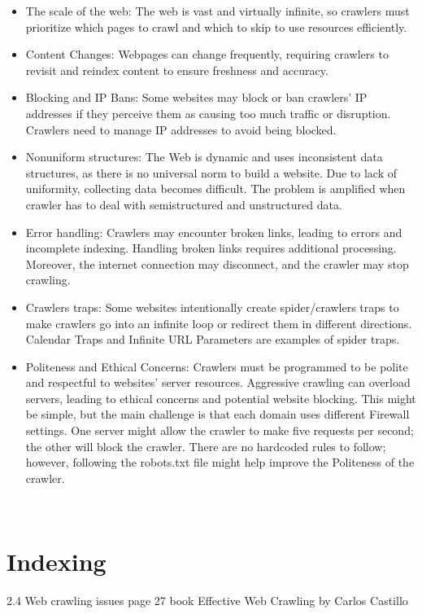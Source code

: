 \begin{itemize}
\item The scale of the web: The web is vast and virtually infinite, so crawlers must prioritize which pages to crawl and which to skip to use resources efficiently.

\item Content Changes: Webpages can change frequently, requiring crawlers to revisit and reindex content to ensure freshness and accuracy.

\item Blocking and IP Bans: Some websites may block or ban crawlers' IP addresses if they perceive them as causing too much traffic or disruption. Crawlers need to manage IP addresses to avoid being blocked.

\item Nonuniform structures: The Web is dynamic
and uses inconsistent data structures, as there is
no universal norm to build a website. Due to lack of uniformity, collecting data becomes difficult. The problem is amplified when crawler has to deal with semistructured and unstructured data.

\item Error handling: Crawlers may encounter broken links, leading to errors and incomplete indexing. Handling broken links requires additional processing. Moreover, the internet connection may disconnect, and the crawler may stop crawling. 

\item Crawlers traps: Some websites intentionally create spider/crawlers traps to make crawlers go into an infinite loop or redirect them in different directions. Calendar Traps and Infinite URL Parameters are examples of spider traps.

\item Politeness and Ethical Concerns: Crawlers must be programmed to be polite and respectful to websites' server resources. Aggressive crawling can overload servers, leading to ethical concerns and potential website blocking. This might be simple, but the main challenge is that each domain uses different Firewall settings. One server might allow the crawler to make five requests per second; the other will block the crawler. There are no hardcoded rules to follow; however, following the robots.txt file might help improve the  Politeness of the crawler.
\end{itemize}


\\


\section{Indexing}
2.4 Web crawling issues page 27 book Effective Web Crawling by Carlos Castillo
